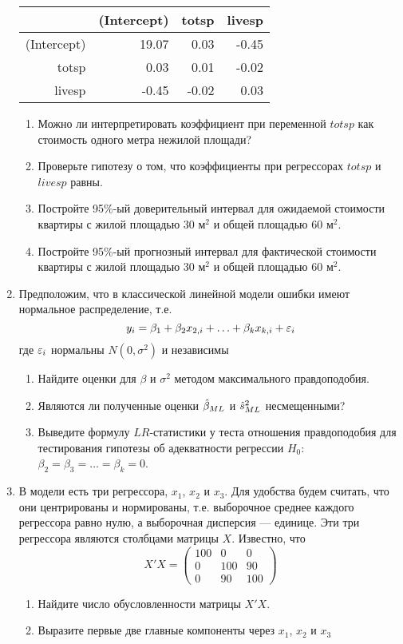 \documentclass[12pt, a4paper]{article}
\theoremstyle{definition}
\begin{document}
\begin{enumerate}
\begin{tabular}{rrrr}
  \hline
 & (Intercept) & totsp & livesp \\
  \hline
(Intercept) & 19.07 & 0.03 & -0.45 \\
  totsp & 0.03 & 0.01 & -0.02 \\
  livesp & -0.45 & -0.02 & 0.03 \\
   \hline
\end{tabular}


\begin{enumerate}
\item Можно ли интерпретировать коэффициент при переменной $totsp$ как стоимость одного метра нежилой площади?
\item Проверьте гипотезу о том, что коэффициенты при регрессорах $totsp$ и $livesp$ равны.
\item Постройте 95\%-ый доверительный интервал для ожидаемой стоимости квартиры с жилой площадью $30$ м$^2$ и общей площадью $60$ м$^2$.
\item Постройте 95\%-ый прогнозный интервал для фактической стоимости квартиры с жилой площадью $30$ м$^2$ и общей площадью $60$ м$^2$.
\end{enumerate}


\item Предположим, что в классической линейной модели ошибки имеют нормальное распределение, т.е.
\[
y_i=\beta_1+\beta_2 x_{2,i}+\ldots+\beta_k x_{k,i}+\varepsilon_i
\]
где $\varepsilon_i$ нормальны $N(0,\sigma^2)$ и независимы
\begin{enumerate}
\item Найдите оценки для $\beta$ и $\sigma^2$ методом максимального правдоподобия.
\item Являются ли полученные оценки $\hat{\beta}_{ML}$ и $\hat{s}^2_{ML}$ несмещенными?
\item Выведите формулу $LR$-статистики у теста отношения правдоподобия для тестирования гипотезы об адекватности регрессии $H_0$: $\beta_2=\beta_3=\ldots=\beta_k=0$.
\end{enumerate}


\item В модели есть три регрессора, $x_1$, $x_2$ и $x_3$. Для удобства будем считать, что они центрированы и нормированы, т.е. выборочное среднее каждого регрессора равно нулю, а выборочная дисперсия — единице. Эти три регрессора являются столбцами матрицы $X$. Известно, что
\[
X'X=\left(\begin{array}{ccc}
100 & 0 & 0 \\
0 & 100 & 90 \\
0 & 90 & 100
\end{array}\right)
\]
\begin{enumerate}
\item Найдите число обусловленности матрицы $X'X$.
\item Выразите первые две главные компоненты через $x_1$, $x_2$ и $x_3$
\end{enumerate}


\end{enumerate}
\end{document}
